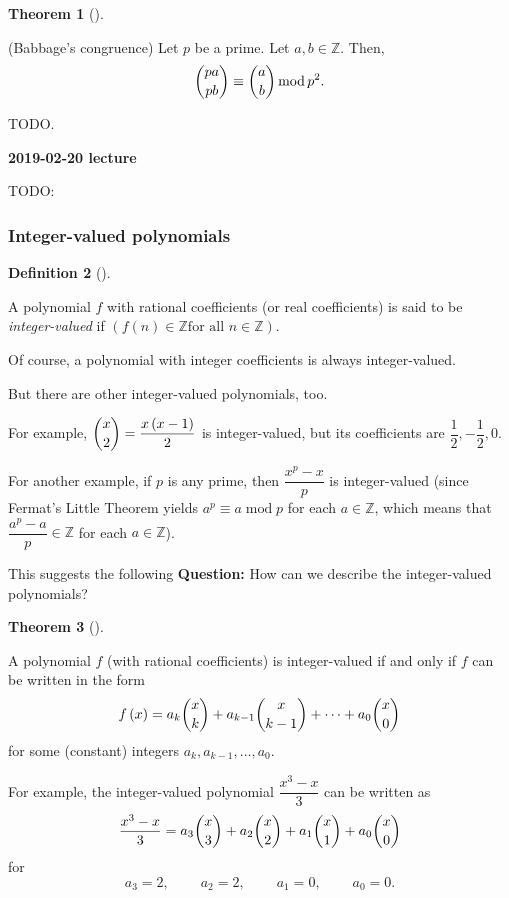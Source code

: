 \documentclass[numbers=enddot,12pt,final,onecolumn,notitlepage]{scrartcl}%
\numberwithin{exer}{subsection}
\theoremstyle{definition}
\newtheorem{theo}{Theorem}[subsection]
\newenvironment{theorem}[1][]
{\begin{theo}[#1]\begin{leftbar}}
{\end{leftbar}\end{theo}}
\newtheorem{defi}[theo]{Definition}
\newenvironment{definition}[1][]
{\begin{defi}[#1]\begin{leftbar}}
{\end{leftbar}\end{defi}}
\begin{document}
\begin{theorem}
(Babbage's congruence) Let $p$ be a prime. Let $a,b\in\mathbb{Z}$. Then,%
\[
\dbinom{pa}{pb}\equiv\dbinom{a}{b}\operatorname{mod}p^{2}.
\]

\end{theorem}

TODO.

\begin{center}
\textbf{2019-02-20 lecture}
\end{center}

TODO:

\subsubsection{Integer-valued polynomials}

\begin{definition}
A polynomial $f$ with rational coefficients (or real coefficients) is said to
be \textit{integer-valued} if $\left(  f\left(  n\right)  \in\mathbb{Z}\text{
for all }n\in\mathbb{Z}\right)  $.
\end{definition}

Of course, a polynomial with integer coefficients is always integer-valued.

But there are other integer-valued polynomials, too.

For example, $\dbinom{x}{2}=\dfrac{x\left(  x-1\right)  }{2}$ is
integer-valued, but its coefficients are $\dfrac{1}{2},-\dfrac{1}{2},0$.

For another example, if $p$ is any prime, then $\dfrac{x^{p}-x}{p}$ is
integer-valued (since Fermat's Little Theorem yields $a^{p}\equiv
a\operatorname{mod}p$ for each $a\in\mathbb{Z}$, which means that
$\dfrac{a^{p}-a}{p}\in\mathbb{Z}$ for each $a\in\mathbb{Z}$).

This suggests the following \textbf{Question:} How can we describe the
integer-valued polynomials?

\begin{theorem}
A polynomial $f$ (with rational coefficients) is integer-valued if and only if
$f$ can be written in the form%
\[
f\left(  x\right)  =a_{k}\dbinom{x}{k}+a_{k-1}\dbinom{x}{k-1}+\cdots
+a_{0}\dbinom{x}{0}%
\]
for some (constant) integers $a_{k},a_{k-1},\ldots,a_{0}$.
\end{theorem}

For example, the integer-valued polynomial $\dfrac{x^{3}-x}{3}$ can be written
as%
\[
\dfrac{x^{3}-x}{3}=a_{3}\dbinom{x}{3}+a_{2}\dbinom{x}{2}+a_{1}\dbinom{x}%
{1}+a_{0}\dbinom{x}{0}%
\]
for
\[
a_{3}=2,\ \ \ \ \ \ \ \ \ \ a_{2}=2,\ \ \ \ \ \ \ \ \ \ a_{1}%
=0,\ \ \ \ \ \ \ \ \ \ a_{0}=0.
\]
\end{document}
